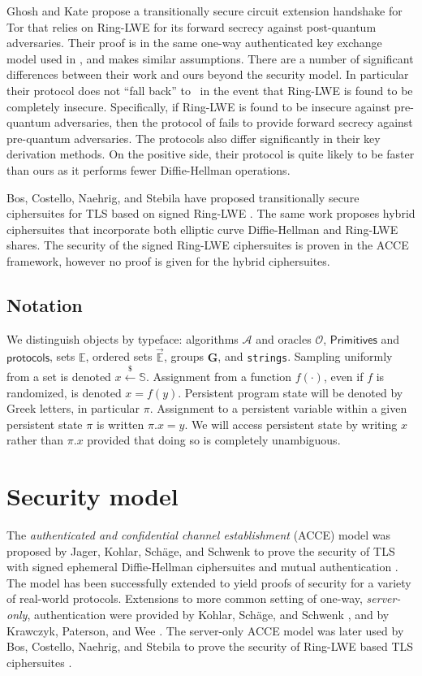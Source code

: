 \documentclass[USenglish,oneside,twocolumn]{article}
\theoremstyle{dgthm}
\theoremstyle{dgdef}
\newcommand{\ntor}{{\sf {ntor}}}
\newcommand{\samples}{\xleftarrow{\$}}
\begin{document}
  Ghosh and Kate \cite{GhoshK15} propose a transitionally secure circuit
  extension handshake for Tor that relies on Ring-LWE for its forward secrecy
  against post-quantum adversaries. Their proof is in the same one-way
  authenticated key exchange model used in \cite{GoldbergSU13}, and makes
  similar assumptions. There are a number of significant differences between
  their work and ours beyond the security model. In particular their protocol
  does not ``fall back'' to \ntor~in the event that Ring-LWE is found to be
  completely insecure. Specifically, if Ring-LWE is found to be insecure
  against pre-quantum adversaries, then the protocol of \cite{GhoshK15} fails
  to provide forward secrecy against pre-quantum adversaries. The protocols
  also differ significantly in their key derivation methods.  On the positive
  side, their protocol is quite likely to be faster than ours as it performs
  fewer Diffie-Hellman operations.

  Bos, Costello, Naehrig, and Stebila have proposed transitionally
  secure ciphersuites for TLS based on signed Ring-LWE \cite{Bos2015}. The same
  work proposes hybrid ciphersuites that incorporate both elliptic curve
  Diffie-Hellman and Ring-LWE shares.  The security of the signed Ring-LWE
  ciphersuites is proven in the ACCE framework, however no proof is given for
  the hybrid ciphersuites.


\subsection{Notation}
  We distinguish objects by typeface:
  algorithms $\mathcal{A}$ and oracles $\mathcal{O}$,
  $\mathsf{Primitives}$ and $\mathsf{protocols}$,
  sets $\mathbb{E}$,
  ordered sets $\vec{\mathbb{E}}$,
  groups $\mathbf{G}$,
  and {\tt strings}.
  Sampling uniformly from a set is denoted $x \samples \mathbb{S}$.
  Assignment from a function $f(\cdot)$, even if $f$ is randomized,
  is denoted $x = f(y)$.
  Persistent program state will be denoted by Greek letters, in particular
  $\pi$. Assignment to a persistent variable within a given persistent state
  $\pi$ is written $\pi.x = y$. We will access persistent state by writing $x$
  rather than $\pi.x$ provided that doing so is completely unambiguous.


\section{Security model}\label{sec:acce}

  The \emph{authenticated and confidential channel establishment} (ACCE)
  model was proposed by Jager, Kohlar, Sch\"age, and Schwenk to prove the
  security of TLS with signed ephemeral Diffie-Hellman ciphersuites and mutual
  authentication \cite{Jager2012}. The model has been successfully extended to
  yield proofs of security for a variety of real-world protocols.  Extensions
  to more common setting of one-way, \emph{server-only}, authentication were
  provided by Kohlar, Sch\"age, and Schwenk \cite{Kohlar2013}, and by Krawczyk,
  Paterson, and Wee \cite{Krawczyk2013}.  The server-only ACCE model was later
  used by Bos, Costello, Naehrig, and Stebila to prove the security of Ring-LWE
  based TLS ciphersuites \cite{Bos2015}.
\end{document}
